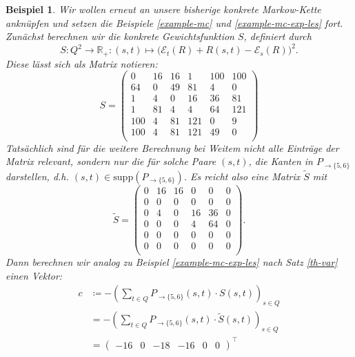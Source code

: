 \documentclass[a4paper]{article}
\newcommand{\mc}{Markow-Kette}
\newtheorem{beispiel}[satz]{Beispiel}
\theoremstyle{nonumberplain}
\begin{document}
	\begin{beispiel}\label{example-mc-var-les}
		Wir wollen erneut an unsere bisherige konkrete \mc{} anknüpfen und setzen die Beispiele \ref{example-mc} und \ref{example-mc-exp-les} fort.
		Zunächst berechnen wir die konkrete Gewichtsfunktion $S$, definiert durch
		\[
		S: Q^2 \to \mathbb{R}_+ : (s,t) \mapsto \big(\mathcal{E}_{t}(R) + R(s,t) - \mathcal{E}_{s}(R)\big)^2\text{.}
		\]
		Diese lässt sich als Matrix notieren:
		\begin{equation*}
		S = \begin{pmatrix}
		0 & 16 & 16 & 1 & 100 & 100 \\
		64 & 0 & 49 & 81 & 4 & 0 \\
		1 & 4 & 0 & 16 & 36 & 81 \\
		1 & 81 & 4 & 4 & 64 & 121 \\
		100 & 4 & 81 & 121 & 0 & 9 \\
		100 & 4 & 81 & 121 & 49 & 0 \\
		\end{pmatrix}
		\end{equation*}
		Tatsächlich sind für die weitere Berechnung bei Weitem nicht alle Einträge der Matrix relevant, sondern nur die für solche Paare $(s,t)$, die Kanten in $P_{\rightarrow \{5,6\}}$ darstellen, d.h. $(s,t) \in \mathrm{supp}(P_{\rightarrow \{5,6\}})$. Es reicht also eine Matrix $\tilde{S}$ mit
		\begin{equation*}
		\tilde{S} = \begin{pmatrix}
		0 & 16 & 16 & 0 & 0 & 0 \\
		0 & 0 & 0 & 0 & 0 & 0 \\
		0 & 4 & 0 & 16 & 36 & 0 \\
		0 & 0 & 0 & 4 & 64 & 0 \\
		0 & 0 & 0 & 0 & 0 & 0 \\
		0 & 0 & 0 & 0 & 0 & 0 \\
		\end{pmatrix}\text{.}
		\end{equation*}
		Dann berechnen wir analog zu Beispiel \ref{example-mc-exp-les} nach Satz \ref{th-var} einen Vektor:
		\begin{align*}
		c &\coloneqq - \left(\sum_{t \in Q}{ P_{\rightarrow \{5,6\}}(s,t) \cdot S(s,t) }\right)_{s \in Q} \\
		&= - \left(\sum_{t \in Q}{ P_{\rightarrow \{5,6\}}(s,t) \cdot \tilde{S}(s,t) }\right)_{s \in Q} \\
		&= \begin{pmatrix} -16 & 0 & -18 & -16 & 0 & 0 \end{pmatrix}^\intercal

\end{align*}
\end{beispiel}
\end{document}
